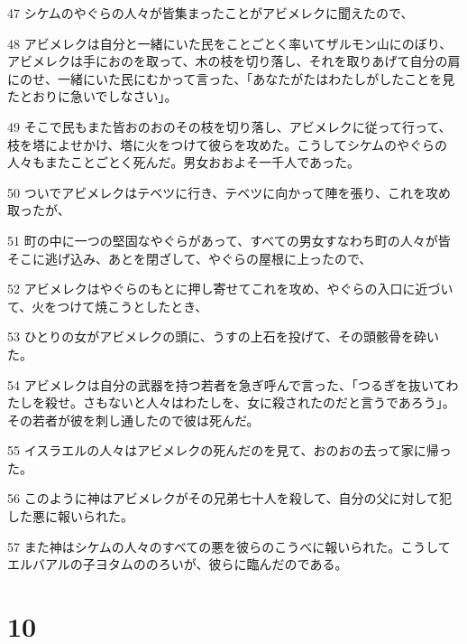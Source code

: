 \par 47 シケムのやぐらの人々が皆集まったことがアビメレクに聞えたので、
\par 48 アビメレクは自分と一緒にいた民をことごとく率いてザルモン山にのぼり、アビメレクは手におのを取って、木の枝を切り落し、それを取りあげて自分の肩にのせ、一緒にいた民にむかって言った、「あなたがたはわたしがしたことを見たとおりに急いでしなさい」。
\par 49 そこで民もまた皆おのおのその枝を切り落し、アビメレクに従って行って、枝を塔によせかけ、塔に火をつけて彼らを攻めた。こうしてシケムのやぐらの人々もまたことごとく死んだ。男女おおよそ一千人であった。
\par 50 ついでアビメレクはテベツに行き、テベツに向かって陣を張り、これを攻め取ったが、
\par 51 町の中に一つの堅固なやぐらがあって、すべての男女すなわち町の人々が皆そこに逃げ込み、あとを閉ざして、やぐらの屋根に上ったので、
\par 52 アビメレクはやぐらのもとに押し寄せてこれを攻め、やぐらの入口に近づいて、火をつけて焼こうとしたとき、
\par 53 ひとりの女がアビメレクの頭に、うすの上石を投げて、その頭骸骨を砕いた。
\par 54 アビメレクは自分の武器を持つ若者を急ぎ呼んで言った、「つるぎを抜いてわたしを殺せ。さもないと人々はわたしを、女に殺されたのだと言うであろう」。その若者が彼を刺し通したので彼は死んだ。
\par 55 イスラエルの人々はアビメレクの死んだのを見て、おのおの去って家に帰った。
\par 56 このように神はアビメレクがその兄弟七十人を殺して、自分の父に対して犯した悪に報いられた。
\par 57 また神はシケムの人々のすべての悪を彼らのこうべに報いられた。こうしてエルバアルの子ヨタムののろいが、彼らに臨んだのである。

\chapter{10}

